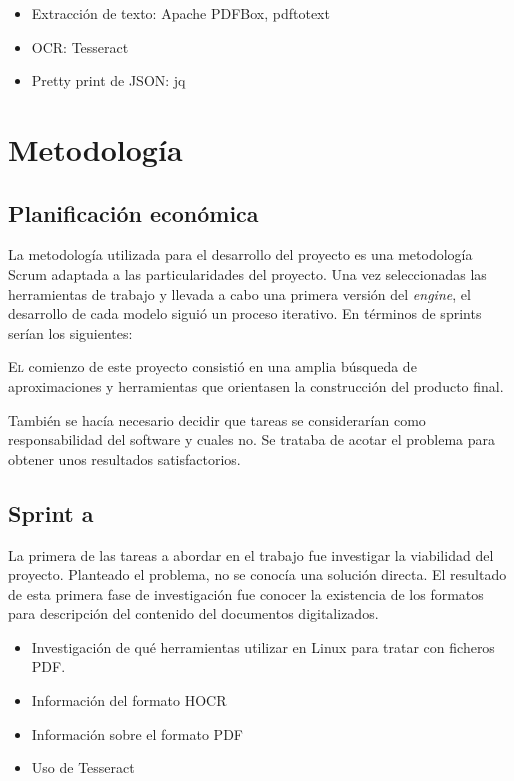 \begin{itemize}
	\item Extracción de texto: Apache PDFBox, pdftotext
	\item OCR: Tesseract
	\item Pretty print de JSON: jq
\end{itemize}


\chapter{Metodología}
\label{chap:metodologia}

\section{Planificación económica}

La metodología utilizada para el desarrollo del proyecto es una metodología Scrum adaptada a las particularidades del proyecto. Una vez seleccionadas las herramientas de trabajo y llevada a cabo una primera versión del \emph{engine}, el desarrollo de cada modelo siguió un proceso iterativo. En términos de sprints serían los siguientes:

\lettrine{E}{l} comienzo de este proyecto consistió en una amplia búsqueda de aproximaciones y herramientas que orientasen la construcción del producto final.

También se hacía necesario decidir que tareas se considerarían como responsabilidad del software y cuales no. Se trataba de acotar el problema para obtener unos resultados satisfactorios. 

\section{Sprint a}

La primera de las tareas a abordar en el trabajo fue investigar la viabilidad del proyecto. Planteado el problema, no se conocía una solución directa. El resultado de esta primera fase de investigación fue conocer la existencia de los formatos para descripción del contenido del documentos digitalizados.

\begin{itemize}
    \item Investigación de qué herramientas utilizar en Linux para tratar con ficheros PDF.
    \item Información del formato HOCR
    \item Información sobre el formato PDF
    \item Uso de Tesseract
\end{itemize}

